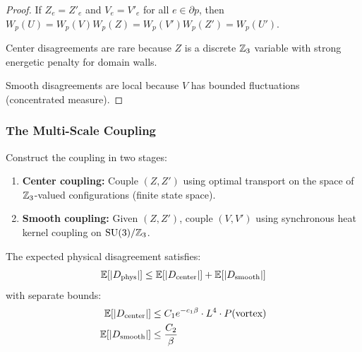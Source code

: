 \begin{proof}
If $Z_e = Z'_e$ and $V_e = V'_e$ for all $e \in \partial p$, then 
$W_p(U) = W_p(V) W_p(Z) = W_p(V') W_p(Z') = W_p(U')$.

Center disagreements are rare because $Z$ is a discrete $\mathbb{Z}_3$ variable with 
strong energetic penalty for domain walls.

Smooth disagreements are local because $V$ has bounded fluctuations (concentrated measure).
\end{proof}

\subsubsection{The Multi-Scale Coupling}

\begin{definition}
Construct the coupling in two stages:
\begin{enumerate}
\item \textbf{Center coupling:} Couple $(Z, Z')$ using optimal transport on the 
space of $\mathbb{Z}_3$-valued configurations (finite state space).
\item \textbf{Smooth coupling:} Given $(Z, Z')$, couple $(V, V')$ using synchronous 
heat kernel coupling on $\mathrm{SU}(3)/\mathbb{Z}_3$.
\end{enumerate}
\end{definition}

\begin{theorem}\label{thm:multiscale}
The expected physical disagreement satisfies:
\[
\mathbb{E}[|D_{\mathrm{phys}}|] \leq \mathbb{E}[|D_{\mathrm{center}}|] + \mathbb{E}[|D_{\mathrm{smooth}}|]
\]
with separate bounds:
\begin{align}
\mathbb{E}[|D_{\mathrm{center}}|] &\leq C_1 e^{-c_1 \beta} \cdot L^4 \cdot P(\text{vortex}) \\
\mathbb{E}[|D_{\mathrm{smooth}}|] &\leq \frac{C_2}{\beta}
\end{align}
\end{theorem}

